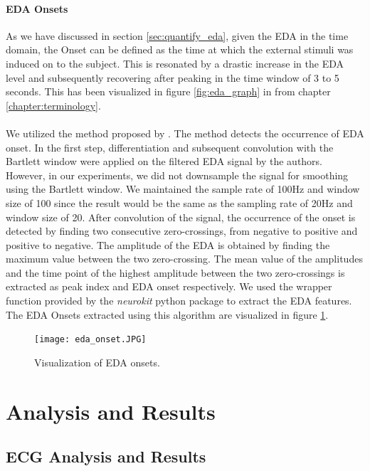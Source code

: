 \paragraph{EDA Onsets} As we have discussed in section \ref{sec:quantify_eda}, given the EDA in the time domain, the Onset can be defined as the time at which the external stimuli was induced on to the subject. This is resonated by a drastic increase in the EDA level and subsequently recovering after peaking in the time window of 3 to 5 seconds. This has been visualized in figure \ref{fig:eda_graph} in from chapter \ref{chapter:terminology}.

\paragraph{} We utilized the method proposed by \citeauthor{kim_emotion_2004} \cite{kim_emotion_2004}. The method detects the occurrence of EDA onset. In the first step, differentiation and subsequent convolution with the Bartlett window were applied on the filtered EDA signal by the authors. However, in our experiments, we did not downsample the signal for smoothing using the Bartlett window. We maintained the sample rate of 100Hz and window size of 100 since the result would be the same as the sampling rate of 20Hz and window size of 20. After convolution of the signal, the occurrence of the onset is detected by finding two consecutive zero-crossings, from negative to positive and positive to negative. The amplitude of the EDA is obtained by finding the maximum value between the two zero-crossing. The mean value of the amplitudes and the time point of the highest amplitude between the two zero-crossings is extracted as peak index and EDA onset respectively. We used the wrapper function provided by the \textit{neurokit} python package to extract the EDA features. The EDA Onsets extracted using this algorithm are visualized in figure \ref{fig:eda_onsets}.

\begin{figure}
    \centering
    \texttt{[image: eda\_onset.JPG]}
    \caption{Visualization of EDA onsets.}
    \label{fig:eda_onsets}
\end{figure}

\section{Analysis and Results}

\subsection{ECG Analysis and Results}
